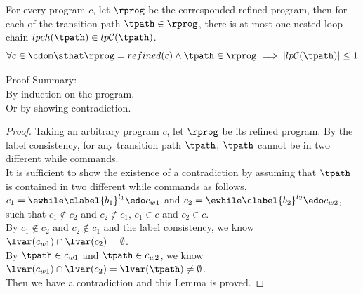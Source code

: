   \begin{lem}
    \label{lem:lpch_unique}
    For every program $c$, let $\rprog$ be the corresponded refined program, 
    then for each of the transition path $\tpath \in \rprog$, there is at most one nested loop chain $lpch(\tpath) \in lp\mathcal{C}(\tpath)$.
    \[
      \forall c \in \cdom \sthat \rprog = refined(c) \land \tpath \in \rprog \implies 
      |lp\mathcal{C}(\tpath)| \leq 1\]
  \end{lem}
  Proof Summary:
  \\
  By induction on the program.
  \\
  Or by showing contradiction.
  \begin{proof}
    Taking an arbitrary program $c$, let $\rprog$ be its  refined program.
    By the label consistency, for any transition path $\tpath$, $\tpath$ cannot be in two different while commands.
    \\
    It is sufficient to show the existence of a contradiction by assuming that 
    $\tpath$ is contained in two different while commands as follows,
    \\
    $c_1 = \ewhile \clabel{b_1}^{l_1} \edo c_{w1}$ and $c_2 = \ewhile \clabel{b_2}^{l_2} \edo c_{w2}$, 
    \\
    such that $c_1 \not\in c_2$ and $c_2 \not\in c_1$,
    $c_1 \in c$ and $c_2 \in c$.
    \\
    By $c_1 \not\in c_2$ and $c_2 \not\in c_1$ and the label consistency, we know 
    $\lvar(c_{w1}) \cap \lvar(c_2) = \emptyset$.
    \\
    By $\tpath \in c_{w1}$ and $\tpath \in c_{w2}$, we know 
    $\lvar(c_{w1}) \cap \lvar(c_2) = \lvar(\tpath) \neq \emptyset$.
    \\
    Then we have a contradiction and this Lemma is proved.    
  \end{proof}